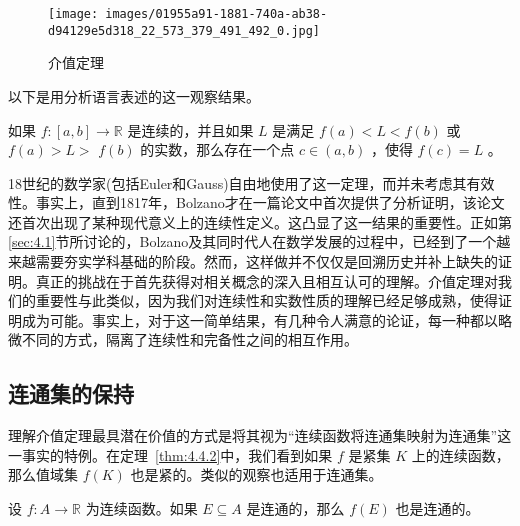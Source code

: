 \begin{figure}[h]
  \centering
  \texttt{[image: images/01955a91-1881-740a-ab38-d94129e5d318\_22\_573\_379\_491\_492\_0.jpg]}
  \caption{介值定理}
  \label{fig:4.8}
\end{figure}


以下是用分析语言表述的这一观察结果。

\begin{Thm}[介值定理]
  \label{thm:4.5.1}
  如果 \(f : \left\lbrack  {a,b}\right\rbrack   \rightarrow  \mathbb{R}\) 是连续的，并且如果 \(L\) 是满足 \(f\left( a\right)  < L < f\left( b\right)\) 或 \(f\left( a\right)  > L >\)  \(f\left( b\right)\) 的实数，那么存在一个点 \(c \in  \left( {a,b}\right)\) ，使得 \(f\left( c\right)  = L\) 。
\end{Thm}


18世纪的数学家(包括Euler和Gauss)自由地使用了这一定理，而并未考虑其有效性。事实上，直到1817年，Bolzano才在一篇论文中首次提供了分析证明，该论文还首次出现了某种现代意义上的连续性定义。这凸显了这一结果的重要性。正如第\ref{sec:4.1}节所讨论的，Bolzano及其同时代人在数学发展的过程中，已经到了一个越来越需要夯实学科基础的阶段。然而，这样做并不仅仅是回溯历史并补上缺失的证明。真正的挑战在于首先获得对相关概念的深入且相互认可的理解。介值定理对我们的重要性与此类似，因为我们对连续性和实数性质的理解已经足够成熟，使得证明成为可能。事实上，对于这一简单结果，有几种令人满意的论证，每一种都以略微不同的方式，隔离了连续性和完备性之间的相互作用。

\subsection{连通集的保持}

理解介值定理最具潜在价值的方式是将其视为“连续函数将连通集映射为连通集”这一事实的特例。在定理~\ref{thm:4.4.2}中，我们看到如果 \(f\) 是紧集 \(K\) 上的连续函数，那么值域集 \(f\left( K\right)\) 也是紧的。类似的观察也适用于连通集。


\begin{Thm}
  \label{thm:4.5.2}
  设 \(f : A \rightarrow  \mathbb{R}\) 为连续函数。如果 \(E \subseteq  A\) 是连通的，那么 \(f\left( E\right)\) 也是连通的。
\end{Thm}

